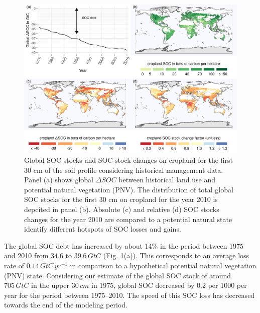 \documentclass[gc, manuscript]{copernicus}
\begin{document}
\begin{figure}[h]
\includegraphics[width=18cm]{../ResultNotebooks/Output/Images/4panelfigure} \caption{Global SOC stocks and SOC stock changes on cropland for the first 30 cm of the soil profile considering historical management data. Panel (a) shows global $\Delta SOC$ between historical land use and potential natural vegetation (PNV). The distribution of total global SOC stocks for the first 30 cm on cropland for the year 2010 is depcited in panel (b). Absolute (c) and relative (d) SOC stocks changes for the year 2010 are compared to a potential natural state identify different hotspots of SOC losses and gains.}\label{fig:SOCmaps}
\end{figure}

The global SOC debt has increased by about 14\% in the period between 1975 and 2010 from \(34.6\) to \(39.6\,\unit{GtC}\) (Fig. \ref{fig:SOCmaps}(a)). This corresponds to an average loss rate of \(0.14\,\unit{GtC\,yr^{-1}}\) in comparison to a hypothetical potential natural vegetation (PNV) state. Considering our estimate of the global SOC stock of around \(705\,\unit{GtC}\) in the upper \(30\,\unit{cm}\) in 1975, global SOC decreased by 0.2 per 1000 per year for the period between 1975--2010. The speed of this SOC loss has decreased towards the end of the modeling period.
\end{document}
